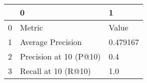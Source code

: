 \begin{tabular}{lll}
\toprule
{} &                       0 &         1 \\
\midrule
0 &                  Metric &     Value \\
1 &       Average Precision &  0.479167 \\
2 &  Precision at 10 (P@10) &       0.4 \\
3 &     Recall at 10 (R@10) &       1.0 \\
\bottomrule
\end{tabular}
